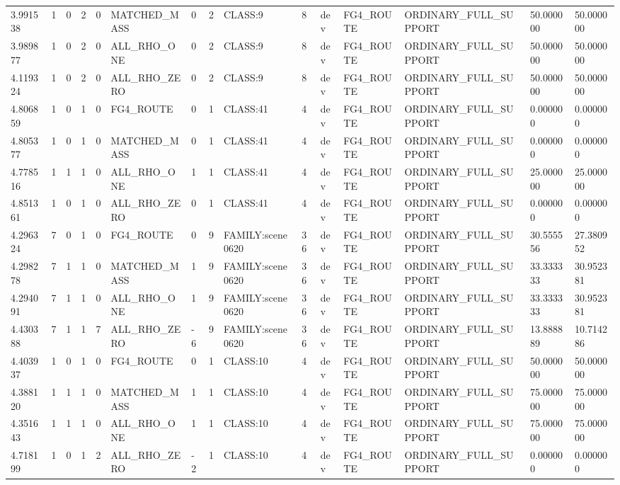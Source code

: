 \begin{tabular}{lllllllllllllll}
3.991538 & 1 & 0 & 2 & 0 & MATCHED\_MASS & 0 & 2 & CLASS:9 & 8 & dev & FG4\_ROUTE & ORDINARY\_FULL\_SUPPORT & 50.000000 & 50.000000 \\
3.989877 & 1 & 0 & 2 & 0 & ALL\_RHO\_ONE & 0 & 2 & CLASS:9 & 8 & dev & FG4\_ROUTE & ORDINARY\_FULL\_SUPPORT & 50.000000 & 50.000000 \\
4.119324 & 1 & 0 & 2 & 0 & ALL\_RHO\_ZERO & 0 & 2 & CLASS:9 & 8 & dev & FG4\_ROUTE & ORDINARY\_FULL\_SUPPORT & 50.000000 & 50.000000 \\
4.806859 & 1 & 0 & 1 & 0 & FG4\_ROUTE & 0 & 1 & CLASS:41 & 4 & dev & FG4\_ROUTE & ORDINARY\_FULL\_SUPPORT & 0.000000 & 0.000000 \\
4.805377 & 1 & 0 & 1 & 0 & MATCHED\_MASS & 0 & 1 & CLASS:41 & 4 & dev & FG4\_ROUTE & ORDINARY\_FULL\_SUPPORT & 0.000000 & 0.000000 \\
4.778516 & 1 & 1 & 1 & 0 & ALL\_RHO\_ONE & 1 & 1 & CLASS:41 & 4 & dev & FG4\_ROUTE & ORDINARY\_FULL\_SUPPORT & 25.000000 & 25.000000 \\
4.851361 & 1 & 0 & 1 & 0 & ALL\_RHO\_ZERO & 0 & 1 & CLASS:41 & 4 & dev & FG4\_ROUTE & ORDINARY\_FULL\_SUPPORT & 0.000000 & 0.000000 \\
4.296324 & 7 & 0 & 1 & 0 & FG4\_ROUTE & 0 & 9 & FAMILY:scene0620 & 36 & dev & FG4\_ROUTE & ORDINARY\_FULL\_SUPPORT & 30.555556 & 27.380952 \\
4.298278 & 7 & 1 & 1 & 0 & MATCHED\_MASS & 1 & 9 & FAMILY:scene0620 & 36 & dev & FG4\_ROUTE & ORDINARY\_FULL\_SUPPORT & 33.333333 & 30.952381 \\
4.294091 & 7 & 1 & 1 & 0 & ALL\_RHO\_ONE & 1 & 9 & FAMILY:scene0620 & 36 & dev & FG4\_ROUTE & ORDINARY\_FULL\_SUPPORT & 33.333333 & 30.952381 \\
4.430388 & 7 & 1 & 1 & 7 & ALL\_RHO\_ZERO & -6 & 9 & FAMILY:scene0620 & 36 & dev & FG4\_ROUTE & ORDINARY\_FULL\_SUPPORT & 13.888889 & 10.714286 \\
4.403937 & 1 & 0 & 1 & 0 & FG4\_ROUTE & 0 & 1 & CLASS:10 & 4 & dev & FG4\_ROUTE & ORDINARY\_FULL\_SUPPORT & 50.000000 & 50.000000 \\
4.388120 & 1 & 1 & 1 & 0 & MATCHED\_MASS & 1 & 1 & CLASS:10 & 4 & dev & FG4\_ROUTE & ORDINARY\_FULL\_SUPPORT & 75.000000 & 75.000000 \\
4.351643 & 1 & 1 & 1 & 0 & ALL\_RHO\_ONE & 1 & 1 & CLASS:10 & 4 & dev & FG4\_ROUTE & ORDINARY\_FULL\_SUPPORT & 75.000000 & 75.000000 \\
4.718199 & 1 & 0 & 1 & 2 & ALL\_RHO\_ZERO & -2 & 1 & CLASS:10 & 4 & dev & FG4\_ROUTE & ORDINARY\_FULL\_SUPPORT & 0.000000 & 0.000000 \\

\end{tabular}
